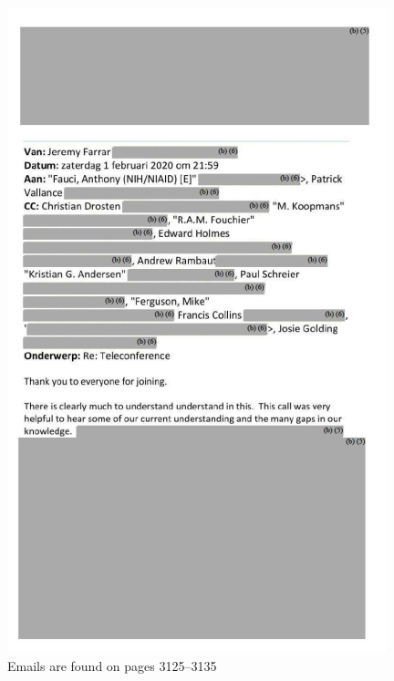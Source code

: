 \documentclass[11pt]{article}
\begin{document}
\begin{figure}[htbp]
\centering
\includegraphics[width=.9\linewidth]{./images/email-zh-7.png}
\caption{Emails are found on pages 3125--3135}
\end{figure}
\end{document}
